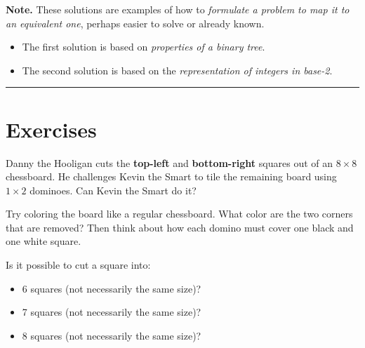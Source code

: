 \documentclass{article}
\begin{document}
\begin{remark*}
    \textbf{Note.} These solutions are examples of how to \textit{formulate a problem to map it to an equivalent one}, perhaps easier to solve or already known.
    \begin{itemize}[topsep=0pt, partopsep=0pt, itemsep=0pt]
        \item The first solution is based on \textit{properties of a binary tree}.
        \item The second solution is based on the \textit{representation of integers in base-2}.
    \end{itemize}
\end{remark*}

\noindent\rule{16.5cm}{0.4pt}

\section{Exercises}

\begin{exercise}\label{example:chessboard-domino-tiling}
    Danny the Hooligan cuts the \textbf{top-left} and \textbf{bottom-right} squares out of an \( 8 \times 8 \) chessboard.  
    He challenges Kevin the Smart to tile the remaining board using \(1 \times 2\) dominoes.  
    Can Kevin the Smart do it?
      
\end{exercise}

\begin{hint*}
    Try coloring the board like a regular chessboard. What color are the two corners that are removed? Then think about how each domino must cover one black and one white square.
\end{hint*}

\begin{exercise}\label{example:square-into-smaller-squares}
    Is it possible to cut a square into:
    \begin{itemize}[topsep=0pt, itemsep=2pt]
        \item 6 squares (not necessarily the same size)?
        \item 7 squares (not necessarily the same size)?
        \item 8 squares (not necessarily the same size)?
    \end{itemize}
     
\end{exercise}
\end{document}
